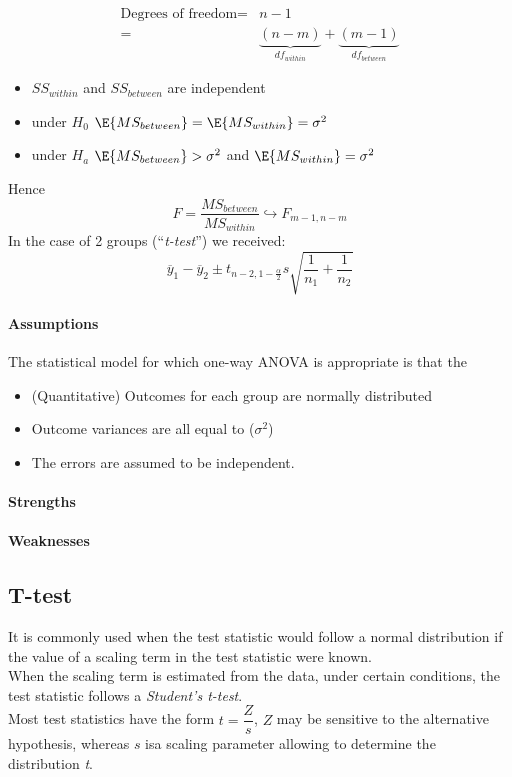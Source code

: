 \begin{align*}
	\text{Degrees of freedom} =& n - 1\\
	=& \underbrace{(n-m)}_{df_{within}} + \underbrace{(m-1)}_{df_{between}}
\end{align*}
\begin{itemize}
	\item $SS_{within}$ and $SS_{between}$ are independent
	\item under $H_{0}$ $\E{MS_{between}} = \E{MS_{within}} = \sigma^{2}$
	\item under $H_{a}$ $\E{MS_{between}}>\sigma^{2}$ and $\E{MS_{within}} = \sigma^{2}$
\end{itemize}
Hence $$ F= \dfrac{MS_{between}}{MS_{within}}\hookrightarrow F_{m-1,n-m}$$
In the case of 2 groups (``\emph{t-test}'') we received:
$$ \overline{y}_{1}-\overline{y}_{2} \pm t_{n-2,1-\frac{\alpha}{2}}s\sqrt{\frac{1}{n_{1}}+
\frac{1}{n_{2}}}$$


\paragraph{Assumptions}
\begin{center}
	The statistical model for which one-way ANOVA is appropriate is that the
	\begin{itemize}
		\item (Quantitative) Outcomes for each group are normally distributed
		\item Outcome variances are all equal to  ($\sigma^{2}$)
		\item The errors are assumed to be independent.
	\end{itemize}
\end{center}
\paragraph{Strengths}
\paragraph{Weaknesses}

\subsection{T-test}
It is commonly used when the test statistic would follow a normal distribution
if the value of a scaling term in the test statistic were known.\\
When the scaling term is estimated from the data, under certain conditions, the
test statistic follows a \emph{Student's t-test}.\\
Most test statistics have the form $t=\dfrac{Z}{s}$, $Z$ may be sensitive to 
the alternative hypothesis, whereas $s$ isa scaling parameter allowing to determine
the distribution \emph{t}.
